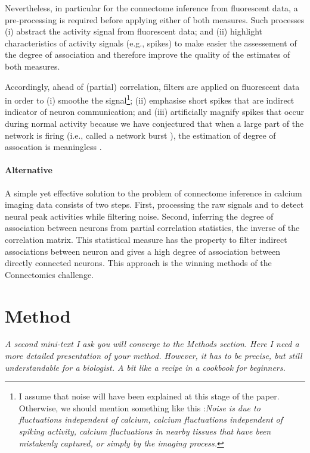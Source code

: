 \documentclass[wcp]{jmlr}
\begin{document}
Nevertheless, in particular for the connectome inference from fluorescent
data, a pre-processing is required before applying either of both measures.
Such processes (i) abstract the activity signal from fluorescent data; and
(ii) highlight characteristics of activity signals (e.g., spikes) to make
easier the assessement of the degree of association and therefore improve the
quality of the estimates of both measures.

Accordingly, ahead of (partial) correlation, filters are applied on
fluorescent data in order to (i) smoothe the signal\footnote{I assume that
noise will have been explained at this stage of the paper. Otherwise, we
should mention something like this :\textit{Noise is due to fluctuations
independent of calcium, calcium fluctuations independent of spiking activity,
calcium fluctuations in nearby tissues that have been mistakenly captured, or
simply by the imaging process.}}; (ii) emphasise short spikes that are
indirect indicator of neuron communication; and (iii) artificially magnify
spikes that occur during normal activity because we have conjectured that when
a large part of the network is firing (i.e., called a network burst
\citep{stetter2012model}), the estimation of degree of assocation is
meaningless \citep{sutera2014simple}.

\paragraph{Alternative}
A simple yet effective solution to the problem of connectome inference in
calcium imaging data consists of two steps. \cite{sutera2014simple} First,
processing the raw signals and to detect neural peak activities while filtering
noise. Second, inferring the degree of association between neurons from partial
correlation statistics, the inverse of the correlation matrix. This statistical
measure has the property to filter indirect associations between neuron and
gives a high degree of association between directly connected neurons. This
approach is the winning methods of the Connectomics challenge.

\section{Method}
\emph{A second mini-text I ask you will converge to the Methods section. Here I need
a more detailed presentation of your method. However, it has to be precise, but
still understandable for a biologist. A bit like a recipe in a cookbook for
beginners.\\}
\end{document}
